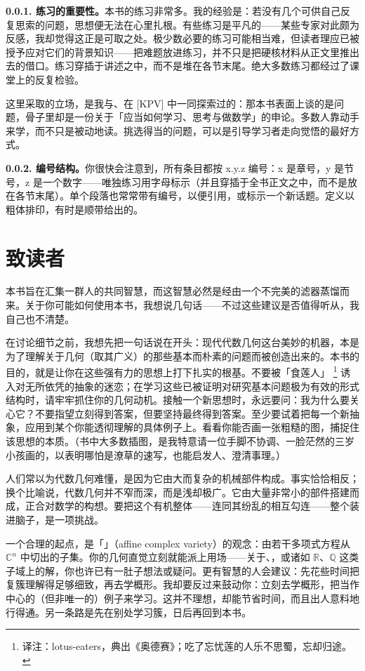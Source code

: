 \noindent\textbf{0.0.1. 练习的重要性。}\quad 本书的练习非常多。我的经验是：若没有几个可供自己反复思索的问题，思想便无法在心里扎根。有些练习是平凡的——某些专家对此颇为反感，我却觉得这正是可取之处。极少数必要的练习可能相当难，但读者理应已被授予应对它们的背景知识——把难题放进练习，并不只是把硬核材料从正文里推出去的借口。练习穿插于讲述之中，而不是堆在各节末尾。绝大多数练习都经过了课堂上的反复检验。

这里采取的立场，是我与\trKedlaya、\trPoonen{}在 [KPV] 中一同探索过的：那本书表面上谈的是问题，骨子里却是一份关于「应当如何学习、思考与做数学」的申论。多数人靠动手来学，而不只是被动地读。挑选得当的问题，可以是引导学习者走向觉悟的最好方式。

\noindent\textbf{0.0.2. 编号结构。}\quad 你很快会注意到，所有条目都按 x.y.z 编号：x 是章号，y 是节号，z 是一个数字——唯独练习用字母标示（并且穿插于全书正文之中，而不是放在各节末尾）。单个段落也常常带有编号，以便引用，或标示一个新话题。定义以粗体排印，有时是顺带给出的。

\section{致读者}

本书旨在汇集一群人的共同智慧，而这智慧必然是经由一个不完美的滤器蒸馏而来。关于你可能如何使用本书，我想说几句话——不过这些建议是否值得听从，我自己也不清楚。

在讨论细节之前，我想先把一句话说在开头：现代代数几何这台美妙的机器，本是为了理解关于几何（取其广义）的那些基本而朴素的问题而被创造出来的。本书的目的，就是让你在这些强有力的思想上打下扎实的根基。不要被「食莲人」%
\footnote{译注：lotus-eaters，典出《奥德赛》；吃了忘忧莲的人乐不思蜀，忘却归途。}
诱入对无所依凭的抽象的迷恋；在学习这些已被证明对研究基本问题极为有效的形式结构时，请牢牢抓住你的几何动机。接触一个新思想时，永远要问：我为什么要关心它？不要指望立刻得到答案，但要坚持最终得到答案。至少要试着把每一个新抽象，应用到某个你能透彻理解的具体例子上。看看你能否画一张粗糙的图，捕捉住该思想的本质。（书中大多数插图，是我特意请一位手脚不协调、一脸茫然的三岁小孩画的，以表明哪怕是潦草的速写，也能启发人、澄清事理。）

人们常以为代数几何难懂，是因为它由大而复杂的机械部件构成。事实恰恰相反；换个比喻说，代数几何并不窄而深，而是浅却极广。它由大量非常小的部件搭建而成，正合\trGrothendieck{}对数学的构想。要把这个有机整体——连同其纷乱的相互勾连——整个装进脑子，是一项挑战。

一个合理的起点，是「\trAffine\trComplex\trVariety{}」（affine complex variety）的观念：由若干多项式方程从 $\mathbb{C}^n$ 中切出的子集。你的几何直觉立刻就能派上用场——关于\trDimension、\trSmoothness，或诸如 $\mathbb{R}$、$\mathbb{Q}$ 这类子域上的解，你也许已有一肚子想法或疑问。更有智慧的人会建议：先花些时间把复簇理解得足够细致，再去学概形。我却要反过来鼓动你：立刻去学概形，把\trAffine\trComplex\trVariety{}当作中心的（但非唯一的）例子来学习。这并不理想，却能节省时间，而且出人意料地行得通。另一条路是先在别处学习簇，日后再回到本书。

